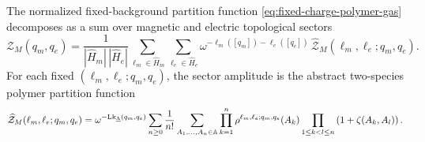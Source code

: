 \begin{prop}
	\label{prop:fourier-resolved-polymer-gas}
	The normalized fixed-background partition function \eqref{eq:fixed-charge-polymer-gas} decomposes as a sum over magnetic and electric topological sectors
	\begin{equation}
		\mathcal Z_M(q_m,q_e)
		=
		\frac{1}{|\widehat H_m|\,|\widehat H_e|}
		\sum_{\ell_m\in \widehat H_m}
		\sum_{\ell_e\in \widehat H_e}
		\omega^{-\ell_m([q_m])-\ell_e([q_e])}\,
		\widehat{\mathcal Z}_M(\ell_m,\ell_e;q_m,q_e).
		\label{eq:Zme-deltaResolved}
	\end{equation}
	For each fixed \((\ell_m,\ell_e;q_m,q_e)\), the sector amplitude is the abstract
	two-species polymer partition function
	\begin{equation}
		\widehat{\mathcal Z}_M(\ell_m,\ell_e;q_m,q_e)
		=
		\omega^{-\mathrm{Lk}_{\underline\Lambda}(q_m,q_e)}
		\sum_{n\ge 0}
		\frac{1}{n!}
		\sum_{A_1,\dots,A_n\in\mathbb A}
		\prod_{k=1}^n \rho^{\ell_m,\ell_e;q_m,q_e}(A_k)
		\prod_{1\le k<l\le n}\left(1+\zeta(A_k,A_l)\right).
		\label{eq:Zlmle}
	\end{equation}
\end{prop}

